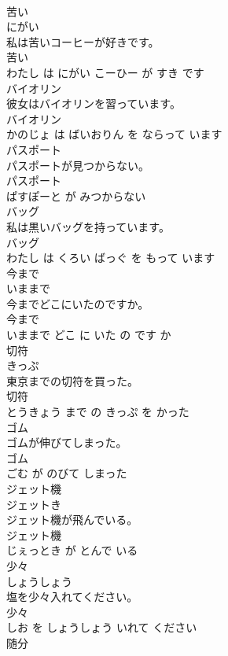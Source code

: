 \documentclass[8pt]{extreport}
\begin{document}
\begin{CJK}{UTF8}{min}
\\	苦い	
\\	にがい			
\\	私は苦いコーヒーが好きです。	
\\	苦い 
\\	わたし は にがい こーひー が すき です			
\\	バイオリン	
\\	彼女はバイオリンを習っています。	
\\	バイオリン 
\\	かのじょ は ばいおりん を ならって います			
\\	パスポート	
\\	パスポートが見つからない。	
\\	パスポート 
\\	ぱすぽーと が みつからない			
\\	バッグ	
\\	私は黒いバッグを持っています。	
\\	バッグ 
\\	わたし は くろい ばっぐ を もって います			
\\	今まで	
\\	いままで			
\\	今までどこにいたのですか。	
\\	今まで 
\\	いままで どこ に いた の です か			
\\	切符	
\\	きっぷ			
\\	東京までの切符を買った。	
\\	切符 
\\	とうきょう まで の きっぷ を かった			
\\	ゴム	
\\	ゴムが伸びてしまった。	
\\	ゴム 
\\	ごむ が のびて しまった			
\\	ジェット機	
\\	ジェットき			
\\	ジェット機が飛んでいる。	
\\	ジェット機 
\\	じぇっとき が とんで いる			
\\	少々	
\\	しょうしょう			
\\	塩を少々入れてください。	
\\	少々 
\\	しお を しょうしょう いれて ください			
\\	随分	

\end{CJK}
\end{document}
